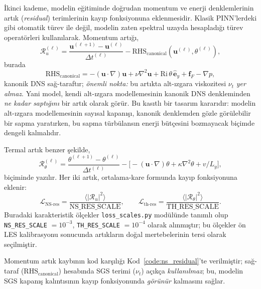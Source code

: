 İkinci kademe, modelin eğitiminde doğrudan momentum ve enerji denklemlerinin artık (\textit{residual}) terimlerinin kayıp fonksiyonuna eklenmesidir. Klasik PINN'lerdeki gibi otomatik türev ile değil, modelin zaten spektral uzayda hesapladığı türev operatörleri kullanılarak. Momentum artığı,
\begin{equation}
\mathcal{R}_{u}^{(\ell)} = \frac{\mathbf{u}^{(\ell+1)} - \mathbf{u}^{(\ell)}}{\Delta t^{(\ell)}} - \mathrm{RHS}_{\mathrm{canonical}}(\mathbf{u}^{(\ell)},\theta^{(\ell)}),
\label{eq:ns_residual}
\end{equation}
burada
\begin{equation}
\mathrm{RHS}_{\mathrm{canonical}} = -(\mathbf{u}\cdot\nabla)\mathbf{u} + \nu\nabla^{2}\mathbf{u} + \mathrm{Ri}\,\theta\,\hat{\mathbf{e}}_{y} + \mathbf{f}_{F} - \nabla p,
\label{eq:rhs_canonical}
\end{equation}
kanonik DNS sağ-taraftır; \emph{önemli nokta:} bu artıkta alt-ızgara viskozitesi $\nu_{t}$ \emph{yer almaz}. Yani model, kendi alt-ızgara modellemesinin kanonik DNS denkleminden \emph{ne kadar saptığını} bir artık olarak görür. Bu kasıtlı bir tasarım kararıdır: modelin alt-ızgara modellemesinin sayısal kapanışı, kanonik denklemden gözle görülebilir bir sapma yaratırken, bu sapma türbülansın enerji bütçesini bozmayacak biçimde dengeli kalmalıdır.

Termal artık benzer şekilde,
\begin{equation}
\mathcal{R}_{\theta}^{(\ell)} = \frac{\theta^{(\ell+1)} - \theta^{(\ell)}}{\Delta t^{(\ell)}} - \big[-(\mathbf{u}\cdot\nabla)\theta + \kappa\nabla^{2}\theta + v/L_{y}\big],
\label{eq:thermal_residual}
\end{equation}
biçiminde yazılır. Her iki artık, ortalama-kare formunda kayıp fonksiyonuna eklenir:
\begin{equation}
\mathcal{L}_{\mathrm{NS\text{-}res}} = \frac{\langle |\mathcal{R}_{u}|^{2}\rangle}{\mathrm{NS\_RES\_SCALE}},
\qquad
\mathcal{L}_{\mathrm{th\text{-}res}} = \frac{\langle |\mathcal{R}_{\theta}|^{2}\rangle}{\mathrm{TH\_RES\_SCALE}}.
\label{eq:tier2_losses}
\end{equation}
Buradaki karakteristik ölçekler \texttt{loss\_scales.py} modülünde tanımlı olup \texttt{NS\_RES\_SCALE} $= 10^{-3}$, \texttt{TH\_RES\_SCALE} $= 10^{-4}$ olarak alınmıştır; bu ölçekler ön LES kalibrasyonu sonucunda artıkların doğal mertebelerinin tersi olarak seçilmiştir.

Momentum artık kaybının kod karşılığı Kod~\ref{code:ns_residual}'te verilmiştir; sağ-taraf ($\mathrm{RHS}_{\mathrm{canonical}}$) hesabında SGS terimi ($\nu_{t}$) açıkça \emph{kullanılmaz}; bu, modelin SGS kapanış kalıntısının kayıp fonksiyonunda \emph{görünür} kalmasını sağlar.

